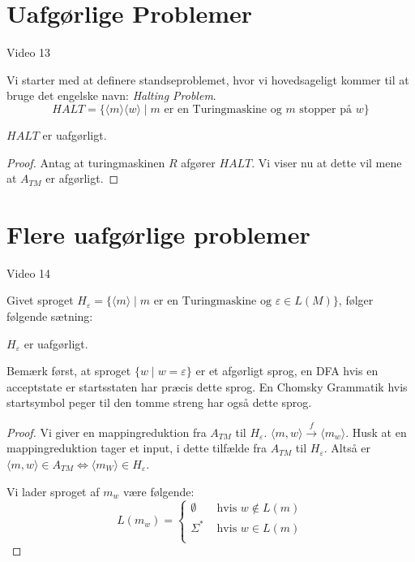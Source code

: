 \section{Uafgørlige Problemer}%
\label{sec:label}

\begin{note}[Kilder]
	Video 13
\end{note}

Vi starter med at definere standseproblemet, hvor vi hovedsageligt kommer til at bruge det engelske navn: \textit{Halting Problem}.
\begin{equation*}
	HALT = \{ \langle m \rangle \langle w \rangle \mid m \text{ er en Turingmaskine og } m \text{ stopper på }w\}
\end{equation*}

\begin{theorem}
	$HALT$ er uafgørligt.
\end{theorem}

\begin{proof}
	Antag at turingmaskinen $R$ afgører $HALT$. Vi viser nu at dette vil mene at $A_{TM}$ er afgørligt.
\end{proof}


\section{Flere uafgørlige problemer}%
\label{sec:label}

\begin{note}[Kilder]
	Video 14
\end{note}

Givet sproget $H_{\varepsilon} = \{ \langle m \rangle  \mid m \text{ er en Turingmaskine og } \varepsilon \in L(M)\}$, følger følgende sætning:

\begin{theorem}
	$H_{\varepsilon}$ er uafgørligt.
\end{theorem}

Bemærk først, at sproget $\{w \mid w = \varepsilon\}$ er et afgørligt sprog, en DFA hvis en acceptstate er startsstaten har præcis dette sprog. En Chomsky Grammatik hvis startsymbol peger til den tomme streng har også dette sprog.

\begin{proof}
	Vi giver en mappingreduktion fra $A_{TM}$ til $H_{\varepsilon}$. $\langle m , w\rangle \stackrel{f}{\longrightarrow} \langle m_{w} \rangle $. Husk at en mappingreduktion tager et input, i dette tilfælde fra $A_{TM}$ til $H_{\varepsilon}$. Altså er $\langle m , w \rangle \in A_{TM} \iff \langle m_{W} \rangle \in H_{\varepsilon}$.

	Vi lader sproget af $m_{w}$ være følgende:
	\begin{equation*}
		L(m_{w}) = \begin{cases}
			\emptyset  & \text{ hvis } w \notin L(m) \\
			\Sigma^{*} & \text{ hvis } w \in L(m)    \\
		\end{cases}
	\end{equation*}
\end{proof}



